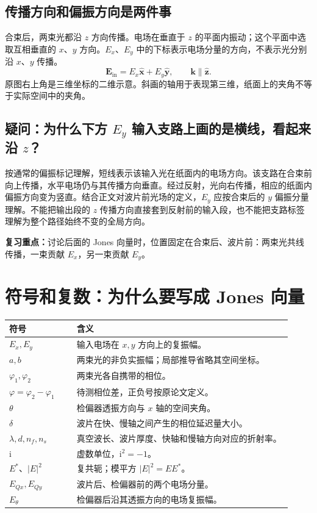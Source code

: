 \documentclass[UTF8,fontset=fandol,11pt,a4paper]{ctexart}
\newcommand{\ii}{\mathrm i}
\newcommand{\note}[1]{\par\noindent\colorbox{pale}{\parbox{\dimexpr\linewidth-2\fboxsep\relax}{\textbf{复习重点：}#1}}\par}
\newcommand{\quest}[2]{\subsection*{疑问：#1}#2}
\begin{document}
\subsection{传播方向和偏振方向是两件事}
合束后，两束光都沿 $z$ 方向传播。电场在垂直于 $z$ 的平面内振动；这个平面中选取互相垂直的 $x$、$y$ 方向。$E_x$、$E_y$ 中的下标表示电场分量的方向，不表示光分别沿 $x$、$y$ 传播。
\begin{equation}
\mathbf E_{\mathrm{in}}=E_x\hat{\mathbf x}+E_y\hat{\mathbf y},\qquad
\mathbf k\parallel\hat{\mathbf z}.
\end{equation}
原图右上角是三维坐标的二维示意。斜画的轴用于表现第三维，纸面上的夹角不等于实际空间中的夹角。

\quest{为什么下方 $E_y$ 输入支路上画的是横线，看起来沿 $z$？}{
按通常的偏振标记理解，短线表示该输入光在纸面内的电场方向。该支路在合束前向上传播，水平电场仍与其传播方向垂直。经过反射，光向右传播，相应的纸面内偏振方向变为竖直。结合正文对波片前光场的定义，$E_y$ 应按合束后的 $y$ 偏振分量理解。不能把输出段的 $z$ 传播方向直接套到反射前的输入段，也不能把支路标签理解为整个路径始终不变的全局方向。}

\note{讨论后面的 Jones 向量时，位置固定在合束后、波片前：两束光共线传播，一束贡献 $E_x$，另一束贡献 $E_y$。}

\clearpage
\section{符号和复数：为什么要写成 Jones 向量}
\begin{longtable}{p{0.22\linewidth}p{0.70\linewidth}}
\toprule
符号 & 含义\\\midrule
$E_x,E_y$ & 输入电场在 $x,y$ 方向上的复振幅。\\
$a,b$ & 两束光的非负实振幅；局部推导省略其空间坐标。\\
$\varphi_1,\varphi_2$ & 两束光各自携带的相位。\\
$\varphi=\varphi_2-\varphi_1$ & 待测相位差，正负号按原论文定义。\\
$\theta$ & 检偏器透振方向与 $x$ 轴的空间夹角。\\
$\delta$ & 波片在快、慢轴之间产生的相位延迟量大小。\\
$\lambda,d,n_f,n_s$ & 真空波长、波片厚度、快轴和慢轴方向对应的折射率。\\
$\ii$ & 虚数单位，$\ii^2=-1$。\\
$E^*$、$|E|^2$ & 复共轭；模平方 $|E|^2=EE^*$。\\
$E_{Qx},E_{Qy}$ & 波片后、检偏器前的两个电场分量。\\
$E_\theta$ & 检偏器后沿其透振方向的电场复振幅。\\
\bottomrule
\end{longtable}
\end{document}
